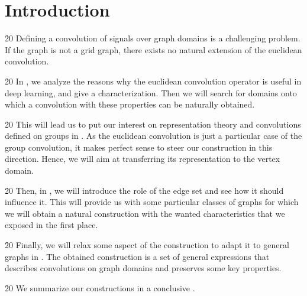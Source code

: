 \section*{Introduction}

\h{20}
Defining a convolution of signals over graph domains is a challenging problem. If the graph is not a grid graph, there exists no natural extension of the euclidean convolution.

\h{20}
In , we analyze the reasons why the euclidean convolution operator is useful in deep learning, and give a characterization. Then we will search for domains onto which a convolution with these properties can be naturally obtained.

\h{20}
This will lead us to put our interest on representation theory and convolutions defined on groups in . As the euclidean convolution is just a particular case of the group convolution, it makes perfect sense to steer our construction in this direction. Hence, we will aim at transferring its representation to the vertex domain.%

\h{20}
Then, in , we will introduce the role of the edge set and see how it should influence it. This will provide us with some particular classes of graphs for which we will obtain a natural construction with the wanted characteristics that we exposed in the first place.

\h{20}
Finally, we will relax some aspect of the construction to adapt it to general graphs in . The obtained construction is a set of general expressions that describes convolutions on graph domains and preserves some key properties.

\h{20}
We summarize our constructions in a conclusive .